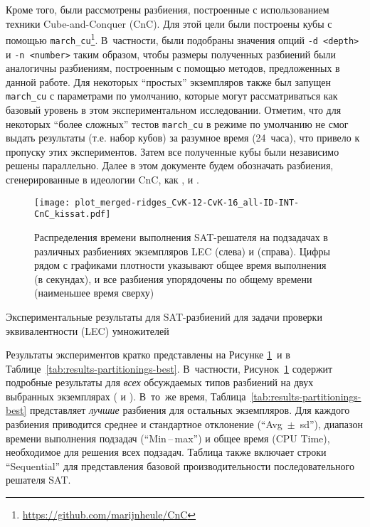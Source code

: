Кроме того, были рассмотрены разбиения, построенные с использованием техники Cube-and-Conquer (CnC).
Для этой цели были построены кубы с помощью \texttt{march\_cu}\footnote{\url{https://github.com/marijnheule/CnC}}.
В~частности, были подобраны значения опций \texttt{-d <depth>} и \texttt{-n <number>} таким образом, чтобы размеры полученных разбиений были аналогичны разбиениям, построенным с помощью методов, предложенных в данной работе.
Для некоторых \enquote{простых} экземпляров также был запущен \texttt{march\_cu} с параметрами по умолчанию, которые могут рассматриваться как базовый уровень в этом экспериментальном исследовании.
Отметим, что для некоторых \enquote{более сложных} тестов \texttt{march\_cu} в режиме по умолчанию не смог выдать результаты (т.е. набор кубов) за разумное время (24~часа), что привело к пропуску этих экспериментов.
Затем все полученные кубы были независимо решены параллельно.
Далее в этом документе будем обозначать разбиения, сгенерированные в идеологии CnC, как ,  и .

\begin{figure}[!htb]
    \centering
    \texttt{[image: plot\_merged-ridges\_CvK-12-CvK-16\_all-ID-INT-CnC\_kissat.pdf]}
    \caption{Распределения времени выполнения SAT-решателя на подзадачах в различных разбиениях экземпляров LEC  (слева) и  (справа). Цифры рядом с графиками плотности указывают общее время выполнения (в секундах), и все разбиения упорядочены по общему времени (наименьшее время сверху)}
    \label{fig:ridges}
\end{figure}

\begin{table}[p]
    \centering
    \caption{Экспериментальные результаты для SAT-разбиений для задачи проверки эквивалентности (LEC) умножителей}
    \label{tab:results-partitionings-best}
    
\end{table}

Результаты экспериментов кратко представлены на Рисунке \ref{fig:ridges}~и в Таблице~\ref{tab:results-partitionings-best}.
В~частности, Рисунок~\ref{fig:ridges} содержит
подробные результаты для \textit{всех} обсуждаемых типов разбиений на двух выбранных экземплярах ( и ).
В~то~же время, Таблица~\ref{tab:results-partitionings-best} представляет \emph{лучшие} разбиения для остальных экземпляров.
Для каждого разбиения приводится среднее и стандартное отклонение (\enquote{Avg~$\pm$~sd}), диапазон времени выполнения подзадач (\enquote{Min\,--\,max}) и общее  время (CPU Time), необходимое для решения всех подзадач.
Таблица также включает строки \enquote{Sequential} для представления базовой производительности последовательного решателя SAT.

